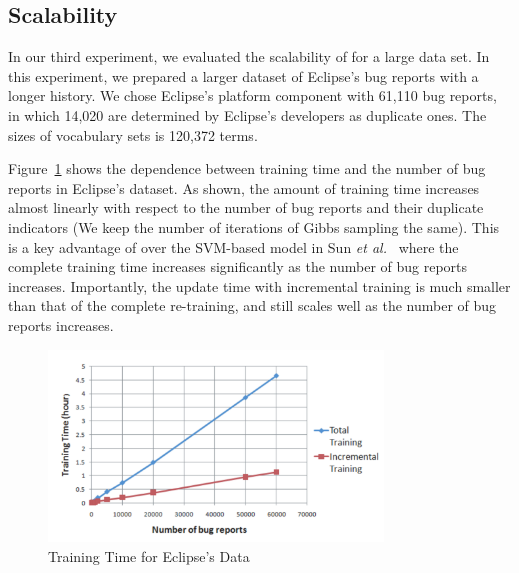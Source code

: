 \subsection{Scalability}

In our third experiment, we evaluated the scalability of {\model}
for a large data set. In this experiment, we prepared a larger dataset
of Eclipse's bug reports with a longer history. We chose Eclipse's
platform component  with 61,110 bug
reports, in which 14,020 are determined by Eclipse's developers as
duplicate ones.  The sizes of vocabulary sets is 120,372 terms. 

Figure~\ref{time} shows the dependence between training time and the
number of bug reports in Eclipse's dataset. As shown, the amount of
training time increases almost linearly with respect to the number of
bug reports and their duplicate indicators (We keep the number of
iterations of Gibbs sampling the same). This is a key advantage of
{\model} over the SVM-based model in Sun {\em et al.}~\cite{davidlo10}
where the complete training time increases significantly as the number
of bug reports increases. Importantly, the update time with
incremental training is much smaller than that of the complete
re-training, and {\model} still scales well as the number of bug
reports increases.

\begin{figure}[t]
\centering
\includegraphics[width=3.5in]{time}
\caption{Training Time for Eclipse's Data}
\label{time}
\end{figure}



